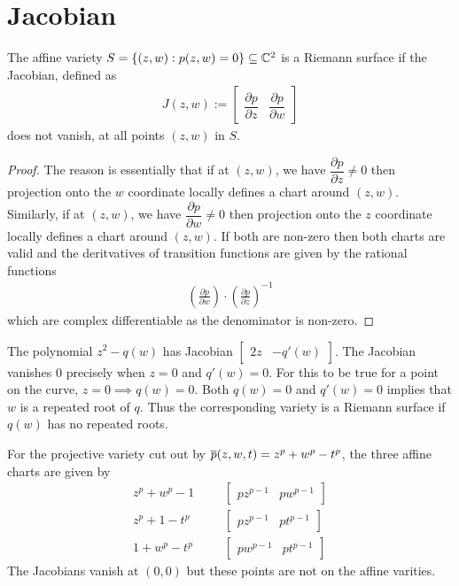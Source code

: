\documentclass{article}
\begin{document}
\section{Jacobian}
\begin{theorem}
  The affine variety $S = \left\{(z,w) : p(z,w) = 0\right\} \subseteq \mathbb{C}^2$ is a Riemann surface if the Jacobian, defined as
  \begin{align*}
    J(z,w) := \begin{bmatrix} \dfrac{\partial p}{\partial z} & \dfrac{\partial p}{\partial w} \end{bmatrix}
  \end{align*}
  does not vanish, at all points $(z,w)$ in $S$.
\end{theorem}
\begin{proof}[Proof]
  The reason is essentially that if at $(z,w)$, we have $\dfrac{\partial p}{\partial z} \neq 0$ then projection onto the $w$ coordinate locally defines a chart around $(z,w)$.
  Similarly, if at $(z,w)$, we have $\dfrac{\partial p}{\partial w} \neq 0$ then projection onto the $z$ coordinate locally defines a chart around $(z,w)$.
  If both are non-zero then both charts are valid and the deritvatives of transition functions are given by the rational functions
  \begin{align*}
    \left(\frac{\partial p}{\partial w}\right) \cdot \left(\frac{\partial p}{\partial z}\right)^{-1}
  \end{align*}
  which are complex differentiable as the denominator is non-zero.
\end{proof}

\begin{ex}
  The polynomial $z^2 - q(w)$ has Jacobian $\begin{bmatrix} 2z & -q'(w) \end{bmatrix}$. The Jacobian vanishes 0 precisely when $z = 0$ and $q'(w) = 0$. For this to be true for a point on the curve, $z=0 \implies q(w) = 0$. Both $q(w) = 0 $ and $q'(w) = 0$ implies that $w$ is a repeated root of $q$.
  Thus the corresponding variety is a Riemann surface if $q(w)$ has no repeated roots.
\end{ex}

\begin{ex}[Fermat]
  For the projective variety cut out by $\overline{p}(z,w,t) = z^p + w^p - t^p$, the three affine charts are given by
  \begin{align*}
    z^p + w^p - 1  &&& \begin{bmatrix} pz^{p-1} & pw^{p-1} \end{bmatrix}\\
    z^p + 1 - t^p &&& \begin{bmatrix} pz^{p-1} & pt^{p-1} \end{bmatrix}\\
    1 + w^p - t^p &&& \begin{bmatrix} pw^{p-1} & pt^{p-1} \end{bmatrix}
  \end{align*}
  The Jacobians vanish at $(0,0)$ but these points are not on the affine varities.
\end{ex}
\end{document}
